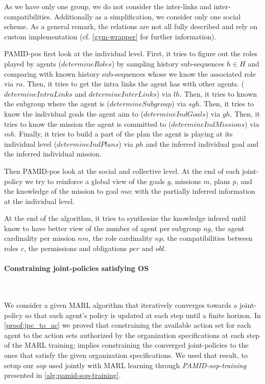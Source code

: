 \documentclass[runningheads]{llncs}
\newcounter{relation}
\newcounter{proof}
\begin{document}
As we have only one group, we do not consider the inter-links and inter-compatibilities. Additionally as a simplification, we consider only one social scheme. As a general remark, the  relations are not all fully described and rely on custom implementation (cf. \autoref{gym-wrapper} for further information).

PAMID-pos first look at the individual level.
First, it tries to figure out the roles played by agents ($determineRoles$) by sampling history sub-sequences $h \in H$ and comparing with known history sub-sequences whose we know the associated role via $ra$.
Then, it tries to get the intra links the agent has with other agents. ($determineIntraLinks$ and $determineInterLinks$) via $lh$.
Then, it tries to known the subgroup where the agent is ($determineSubgroup$) via $sgh$.
Then, it tries to know the individual goals the agent aim to ($determineIndGoals$) via $gh$.
Then, it tries to know the mission the agent is committed to ($determineIndMissions$) via $mh$.
Finally, it tries to build a part of the plan the agent is playing at its individual level ($determineIndPlans$) via $ph$ and the inferred individual goal and the inferred individual mission.

Then PAMID-pos look at the social and collective level.
At the end of each joint-policy we try to reinforce a global view of the goals $g$, missions $m$, plans $p$, and the knowledge of the mission to goal $mo$; with the partially inferred information at the individual level.

At the end of the algorithm, it tries to synthesize the knowledge infered until know to have better view of the number of agent per subgroup $ng$, the agent cardinality per mission $nm$, the role cardinality $np$, the compatibilities between roles $c$, the permissions and obligations $per$ and $obl$.


\paragraph{\textbf{Constraining joint-policies satisfying OS}}

\

We consider a given MARL algorithm that iteratively converges towards a joint-policy so that each agent's policy is updated at each step until a finite horizon. In \autoref{proof:jpc_to_ac} we proved that constraining the available action set for each agent to the action sets authorized by the organization specifications at each step of the MARL training; implies constraining the converged joint-policies to the ones that satisfy the given organization specifications. We used that result, to setup our $sop$ used jointly with MARL learning through \emph{PAMID-sop-training} presented in \autoref{alg:pamid-sop-training}.
\end{document}

